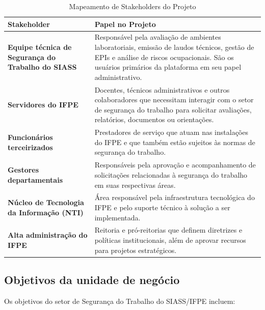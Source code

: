 \documentclass[12pt,a4paper]{article}
\begin{document}
\begin{table}[ht]
\centering
\begin{tcolorbox}[enhanced, colback=white, colframe=gray!40, arc=4mm, boxrule=1pt, width=0.95\textwidth]
\begin{tabular}{|p{3.5cm}|p{9.5cm}|}
\hline
\textbf{Stakeholder} & \textbf{Papel no Projeto} \\
\hline
\textbf{Equipe técnica de Segurança do Trabalho do SIASS} & Responsável pela avaliação de ambientes laboratoriais, emissão de laudos técnicos, gestão de EPIs e análise de riscos ocupacionais. São os usuários primários da plataforma em seu papel administrativo. \\
\hline
\textbf{Servidores do IFPE} & Docentes, técnicos administrativos e outros colaboradores que necessitam interagir com o setor de segurança do trabalho para solicitar avaliações, relatórios, documentos ou orientações. \\
\hline
\textbf{Funcionários terceirizados} & Prestadores de serviço que atuam nas instalações do IFPE e que também estão sujeitos às normas de segurança do trabalho. \\
\hline
\textbf{Gestores departamentais} & Responsáveis pela aprovação e acompanhamento de solicitações relacionadas à segurança do trabalho em suas respectivas áreas. \\
\hline
\textbf{Núcleo de Tecnologia da Informação (NTI)} & Área responsável pela infraestrutura tecnológica do IFPE e pelo suporte técnico à solução a ser implementada. \\
\hline
\textbf{Alta administração do IFPE} & Reitoria e pró-reitorias que definem diretrizes e políticas institucionais, além de aprovar recursos para projetos estratégicos. \\
\hline
\end{tabular}
\end{tcolorbox}
\caption{Mapeamento de Stakeholders do Projeto}
\end{table}

\subsection{Objetivos da unidade de negócio}
Os objetivos do setor de Segurança do Trabalho do SIASS/IFPE incluem:
\end{document}

